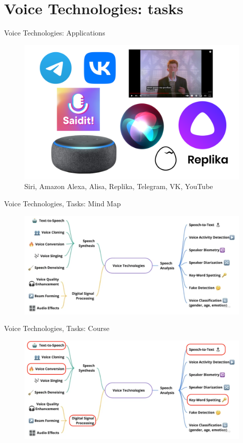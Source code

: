 \section{Voice Technologies: tasks}
\begin{frame}{Voice Technologies: Applications}
	\begin{figure}
		\centering
		\includegraphics[width=0.99\linewidth]{figs/applications.png}
		\caption{Siri, Amazon Alexa, Alisa, Replika, Telegram, VK, YouTube}
	\end{figure}
\end{frame}
\begin{frame}{Voice Technologies, Tasks: Mind Map}
	\begin{figure}
		\centering
		\includegraphics[width=1.03\linewidth]{figs/tasks_1.png}
	\end{figure}
\end{frame}
\begin{frame}{Voice Technologies, Tasks: Course}
	\begin{figure}
		\centering
		\includegraphics[width=1.03\linewidth]{figs/tasks_1_course.png}
	\end{figure}
\end{frame}
